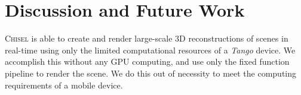 \documentclass[conference]{IEEEtran}
\newcommand{\Tango}{\textit{Tango}\xspace}
\newcommand{\chisel}{\textsc{Chisel}\xspace}
\begin{document}

 
\section{Discussion and Future Work}
\chisel is able to create and render large-scale 3D reconstructions of
scenes in real-time using only the limited computational resources of a
\Tango device. We accomplish this without any GPU computing, and use
only the fixed function pipeline to render the scene. We do this out of
necessity to meet the computing requirements of a mobile device. 
\end{document}
